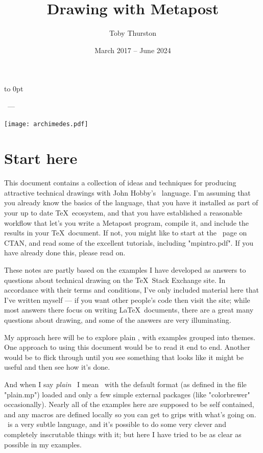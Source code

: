 \documentclass[a4paper,landscape]{article}
\title{Drawing with Metapost}
\author{Toby Thurston}
\date{March 2017 – June 2024}
\begin{document}
\let\folio\thepage
\renewcommand{\thepage}{\rlap{\hbox to 5in{\hss\small\folio}}}
\pagestyle{myheadings}
\raggedbottom
\makeatletter
\moveright 6in\vbox to
0pt{\vskip23pt\noindent\sffamily{\Large\bfseries\@title}\par\bigskip
    \noindent\@author\ --- \@date\par
    \bigskip\noindent
    \texttt{[image: archimedes.pdf]}
\vss}
\makeatother
\thispagestyle{empty}
\section{Start here}

This document contains a collection of ideas and techniques for producing attractive
technical drawings with John Hobby’s \MP\ language.  I’m assuming that you already
know the basics of the language, that you have it installed as part of your up to
date \TeX\ ecosystem, and that you have established a reasonable workflow that
let’s you write a Metapost program, compile it, and include the results in your
\TeX\ document.  If not, you might like to start at the \MP\ page on CTAN, and read
some of the excellent tutorials, including "mpintro.pdf".  If you have already done
this, please read on.

These notes are partly based on the examples I have developed as answers
to questions about technical drawing on the \TeX\ Stack Exchange site.  In
accordance with their terms and conditions, I’ve only included material here that
I’ve written myself --- if you want other people’s code then visit the site;
while most answers there focus on writing \LaTeX\ documents, there are a great
many questions about drawing, and some of the answers are very illuminating.

My approach here will be to explore plain \MP, with examples grouped
into themes.  One approach to using this document would be to read it end to end.
Another would be to flick through until you see something that looks like it might
be useful and then see how it’s done.

And when I say \textit{plain} \MP\ I mean \MP\ with the default format (as defined
in the file "plain.mp") loaded and only a few simple external packages (like
"colorbrewer" occasionally).  Nearly all of the examples here are supposed to be self
contained, and any macros are defined locally so you can get to grips with what’s
going on.  \MP\ is a very subtle language, and it’s possible to do some very clever
and completely inscrutable things with it;  but here I have tried to be as clear as
possible in my examples.
\end{document}
